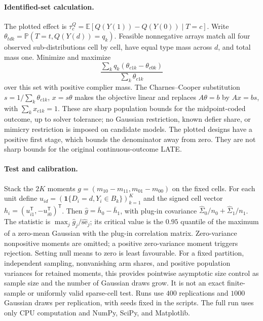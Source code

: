 \documentclass{article}
\theoremstyle{remark}
\newcommand{\Prob}{\mathbb{P}}
\newcommand{\E}{\mathbb{E}}
\begin{document}
\paragraph{Identified-set calculation.}
The plotted effect is $\tau_c^Q=\E[Q(Y(1))-Q(Y(0))\mid T=c]$.
Write $\theta_{tdk}=\Prob(T=t,Q(Y(d))=q_k)$. Feasible nonnegative arrays match
all four observed sub-distributions cell by cell, have equal type mass across
$d$, and total mass one. Minimize and maximize
\[
\frac{\sum_k q_k(\theta_{c1k}-\theta_{c0k})}{\sum_k\theta_{c1k}}
\]
over this set with positive complier mass. The Charnes--Cooper substitution
$s=1/\sum_k\theta_{c1k}$, $x=s\theta$ makes the objective linear and replaces
$A\theta=b$ by $Ax=bs$, with $\sum_k x_{c1k}=1$.
These are sharp population bounds for the midpoint-coded outcome, up to
solver tolerance; no Gaussian restriction, known defier share, or mimicry
restriction is imposed on candidate models. The plotted designs have a
positive first stage, which bounds the denominator away from zero.
They are not sharp bounds for the original continuous-outcome LATE.

\paragraph{Test and calibration.}
Stack the $2K$ moments $g=(m_{10}-m_{11},m_{01}-m_{00})$ on the fixed cells.
For each unit define $u_{id}=(\mathbf1\{D_i=d,Y_i\in B_k\})_{k=1}^K$
and the signed cell vector $h_i=(u_{i1}^{\mathsf T},-u_{i0}^{\mathsf T})^{\mathsf T}$.
Then $\hat g=\bar h_0-\bar h_1$, with
plug-in covariance $\widehat\Sigma_0/n_0+\widehat\Sigma_1/n_1$.
The statistic is $\max_j\hat g_j/\widehat{\mathrm{se}}_j$; its critical value
is the $0.95$ quantile of the maximum of a zero-mean Gaussian with the plug-in
correlation matrix. Zero-variance nonpositive moments are omitted; a positive
zero-variance moment triggers rejection. Setting null means to zero is least
favourable. For a fixed partition, independent sampling, nonvanishing arm
shares, and positive population variances for retained moments, this provides
pointwise asymptotic size control as sample size and the number of Gaussian draws grow.
It is not an exact finite-sample or uniformly valid sparse-cell test.
Runs use $400$ replications and $1000$ Gaussian draws per replication, with
seeds fixed in the scripts. The full run uses only CPU computation and NumPy,
SciPy, and Matplotlib.

\newpage

\end{document}
